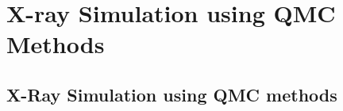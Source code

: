 

\part{X-ray Simulation using QMC Methods}
\chapter{X-Ray Simulation using QMC methods} %

\label{Chapter5} %


